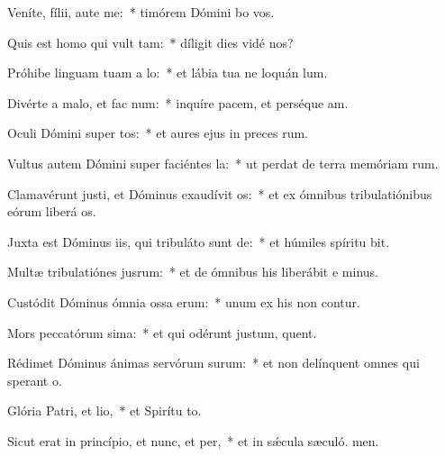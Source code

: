 \item Veníte, fílii, aute me:~* timórem Dómini bo vos.
\item Quis est homo qui vult tam:~* díligit dies vidé nos?
\item Próhibe linguam tuam a lo:~* et lábia tua ne loquán lum.
\item Divérte a malo, et fac num:~* inquíre pacem, et perséque am.
\item Oculi Dómini super tos:~* et aures ejus in preces rum.
\item Vultus autem Dómini super faciéntes la:~* ut perdat de terra memóriam rum.
\item Clamavérunt justi, et Dóminus exaudívit os:~* et ex ómnibus tribulatiónibus eórum liberá os.
\item Juxta est Dóminus iis, qui tribuláto sunt de:~* et húmiles spíritu bit.
\item Multæ tribulatiónes jusrum:~* et de ómnibus his liberábit e minus.
\item Custódit Dóminus ómnia ossa erum:~* unum ex his non contur.
\item Mors peccatórum sima:~* et qui odérunt justum, quent.
\item Rédimet Dóminus ánimas servórum surum:~* et non delínquent omnes qui sperant  o.
\item Glória Patri, et lio,~* et Spirítu to.
\item Sicut erat in princípio, et nunc, et per,~* et in sǽcula sæculó. men.
